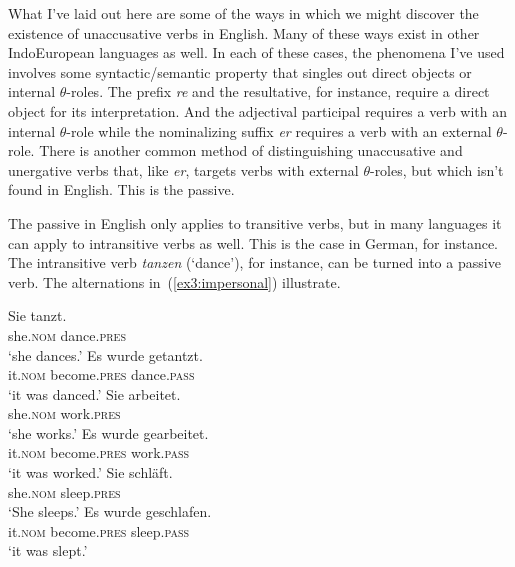 What I've laid out here are some of the ways in which we might discover the existence of unaccusative verbs in English. Many of these ways exist in other IndoEuropean languages as well. In each of these cases, the phenomena I've used involves some syntactic/semantic property that singles out direct objects or internal $\theta$-roles. The prefix \textit{re} and the resultative, for instance, require a direct object for its interpretation. And the adjectival participal requires a verb with an internal $\theta$-role while the nominalizing suffix \textit{er} requires a verb with an external $\theta$-role. There is another common method of distinguishing unaccusative and unergative verbs that, like \textit{er}, targets verbs with external $\theta$-roles, but which isn't found in English. This is the passive. 

The passive in English only applies to transitive verbs, but in many languages it can apply to intransitive verbs as well. This is the case in German, for instance. The intransitive verb \emph{tanzen} (`dance'), for instance, can be turned into a passive verb. The alternations in~(\ref{ex3:impersonal}) illustrate.
\begin{exe}
	\raggedright
	\ex \label{ex3:impersonal} 
	\begin{xlist}
		\ex \gll Sie tanzt. \\ she.\textsc{nom} dance.\textsc{pres}  \\ `she dances.'
		\ex \gll Es wurde getantzt. \\ it.\textsc{nom} become.\textsc{pres} dance.\textsc{pass}  \\ `it was danced.'
		\ex \gll Sie arbeitet.\\ she.\textsc{nom} work.\textsc{pres}\\ `she works.'
		\ex \gll Es wurde gearbeitet.\\ it.\textsc{nom} become.\textsc{pres} work.\textsc{pass}\\ `it was worked.'
		\ex \gll Sie schl\"aft.\\ she.\textsc{nom} sleep.\textsc{pres}\\ `She sleeps.'
		\ex \gll Es wurde geschlafen.\\ it.\textsc{nom} become.\textsc{pres} sleep.\textsc{pass}\\ `it was slept.'
	\end{xlist}
\end{exe}

